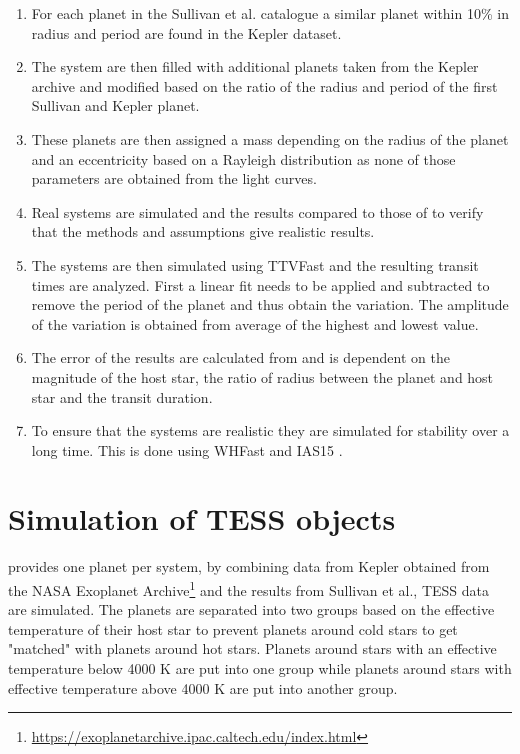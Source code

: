 \documentclass[12pt]{report}
\begin{document}
\begin{enumerate}
	\item For each planet in the Sullivan et al. catalogue a similar planet within 10\% in radius and period are found in the Kepler dataset.
	\item The system are then filled with additional planets taken from the Kepler archive and modified based on the ratio of the radius and period of the first Sullivan and Kepler planet.
	\item These planets are then assigned a mass depending on the radius of the planet \citep{2015ApJ...809...77S} and an eccentricity based on a Rayleigh distribution as none of those parameters are obtained from the light curves.
	\item Real systems are simulated and the results compared to those of \cite{2018ApJS..234....9O} to verify that the methods and assumptions give realistic results.
	\item The systems are then simulated using TTVFast \citep{2014ApJ...787..132D} and the resulting transit times are analyzed. First a linear fit needs to be applied and subtracted to remove the period of the planet and thus obtain the variation. The amplitude of the variation is obtained from average of the highest and lowest value.
	\item The error of the results are calculated from \cite{2005Sci...307.1288H} and is dependent on the magnitude of the host star, the ratio of radius between the planet and host star and the transit duration.
	\item To ensure that the systems are realistic they are simulated for stability over a long time. This is done using WHFast \citep{2015MNRAS.452..376R} and IAS15 \citep{2015MNRAS.446.1424R}.
\end{enumerate}

\section{Simulation of TESS objects}
\label{simTESS}
	\cite{2015ApJ...809...77S} provides one planet per system, by combining data from Kepler obtained from the NASA Exoplanet Archive\footnote{\url{https://exoplanetarchive.ipac.caltech.edu/index.html}} and the results from Sullivan et al., TESS data are simulated. The planets are separated into two groups based on the effective temperature of their host star to prevent planets around cold stars to get "matched" with planets around hot stars. Planets around stars with an effective temperature below 4000 K are put into one group while planets around stars with effective temperature above 4000 K are put into another group.
	
\end{document}
